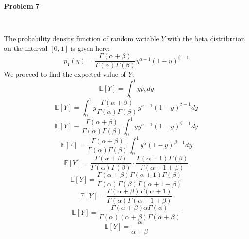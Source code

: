 \textbf{Problem 7}

\begin{solution}\ 


The probability density function of random variable $Y$ with the beta distribution on the interval $[0,1]$ is given here:
\[p_Y(y) = \frac{\Gamma(\alpha + \beta)}{\Gamma(\alpha)\Gamma(\beta)}y^{\alpha -1}(1-y)^{\beta -1}\]
We proceed to find the expected value of $Y$:
\[\mathbb{E}[Y] = \int_0^1yp_Ydy\]
\[\mathbb{E}[Y] = \int_0^1y\frac{\Gamma(\alpha + \beta)}{\Gamma(\alpha)\Gamma(\beta)}y^{\alpha -1}(1-y)^{\beta -1} dy\]
\[\mathbb{E}[Y] = \frac{\Gamma(\alpha + \beta)}{\Gamma(\alpha)\Gamma(\beta)}\int_0^1yy^{\alpha -1}(1-y)^{\beta -1} dy\]
\[\mathbb{E}[Y] = \frac{\Gamma(\alpha + \beta)}{\Gamma(\alpha)\Gamma(\beta)}\int_0^1y^{\alpha }(1-y)^{\beta -1} dy\]
\[\mathbb{E}[Y] = \frac{\Gamma(\alpha + \beta)}{\Gamma(\alpha)\Gamma(\beta)}\cdot\frac{\Gamma(\alpha + 1)\Gamma(\beta)}{\Gamma(\alpha + 1 + \beta)}\]
\[\mathbb{E}[Y] = \frac{\Gamma(\alpha + \beta)\Gamma(\alpha + 1)\Gamma(\beta)}
{\Gamma(\alpha)\Gamma(\beta)\Gamma(\alpha + 1 + \beta)}\]
\[\mathbb{E}[Y] = \frac{\Gamma(\alpha + \beta)\Gamma(\alpha + 1)}{\Gamma(\alpha)\Gamma(\alpha + 1 + \beta)}\]
\[\mathbb{E}[Y] = \frac{\Gamma(\alpha + \beta)\alpha\Gamma(\alpha )}{\Gamma(\alpha)
(\alpha + \beta)\Gamma(\alpha + \beta)}\]
\[\mathbb{E}[Y] = \frac{\alpha}{
\alpha + \beta}\]
\end{solution}